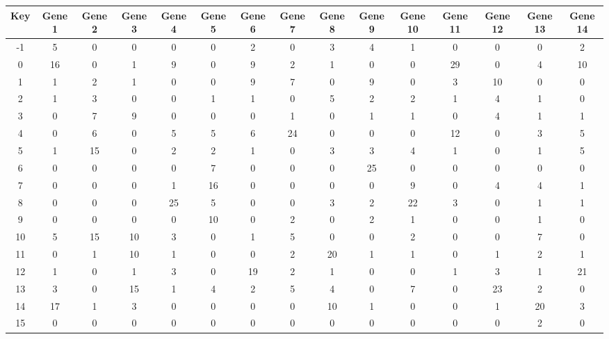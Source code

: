 \begin{tabular}{|c|c|c|c|c|c|c|c|c|c|c|c|c|c|c|}
\hline
Key & Gene 1 & Gene 2 & Gene 3 & Gene 4 & Gene 5 & Gene 6 & Gene 7 & Gene 8 & Gene 9 & Gene 10 & Gene 11 & Gene 12 & Gene 13 & Gene 14 \\
\hline
-1 & 5 & 0 & 0 & 0 & 0 & 2 & 0 & 3 & 4 & 1 & 0 & 0 & 0 & 2 \\
0 & 16 & 0 & 1 & 9 & 0 & 9 & 2 & 1 & 0 & 0 & 29 & 0 & 4 & 10 \\
1 & 1 & 2 & 1 & 0 & 0 & 9 & 7 & 0 & 9 & 0 & 3 & 10 & 0 & 0 \\
2 & 1 & 3 & 0 & 0 & 1 & 1 & 0 & 5 & 2 & 2 & 1 & 4 & 1 & 0 \\
3 & 0 & 7 & 9 & 0 & 0 & 0 & 1 & 0 & 1 & 1 & 0 & 4 & 1 & 1 \\
4 & 0 & 6 & 0 & 5 & 5 & 6 & 24 & 0 & 0 & 0 & 12 & 0 & 3 & 5 \\
5 & 1 & 15 & 0 & 2 & 2 & 1 & 0 & 3 & 3 & 4 & 1 & 0 & 1 & 5 \\
6 & 0 & 0 & 0 & 0 & 7 & 0 & 0 & 0 & 25 & 0 & 0 & 0 & 0 & 0 \\
7 & 0 & 0 & 0 & 1 & 16 & 0 & 0 & 0 & 0 & 9 & 0 & 4 & 4 & 1 \\
8 & 0 & 0 & 0 & 25 & 5 & 0 & 0 & 3 & 2 & 22 & 3 & 0 & 1 & 1 \\
9 & 0 & 0 & 0 & 0 & 10 & 0 & 2 & 0 & 2 & 1 & 0 & 0 & 1 & 0 \\
10 & 5 & 15 & 10 & 3 & 0 & 1 & 5 & 0 & 0 & 2 & 0 & 0 & 7 & 0 \\
11 & 0 & 1 & 10 & 1 & 0 & 0 & 2 & 20 & 1 & 1 & 0 & 1 & 2 & 1 \\
12 & 1 & 0 & 1 & 3 & 0 & 19 & 2 & 1 & 0 & 0 & 1 & 3 & 1 & 21 \\
13 & 3 & 0 & 15 & 1 & 4 & 2 & 5 & 4 & 0 & 7 & 0 & 23 & 2 & 0 \\
14 & 17 & 1 & 3 & 0 & 0 & 0 & 0 & 10 & 1 & 0 & 0 & 1 & 20 & 3 \\
15 & 0 & 0 & 0 & 0 & 0 & 0 & 0 & 0 & 0 & 0 & 0 & 0 & 2 & 0 \\
\hline
\end{tabular}